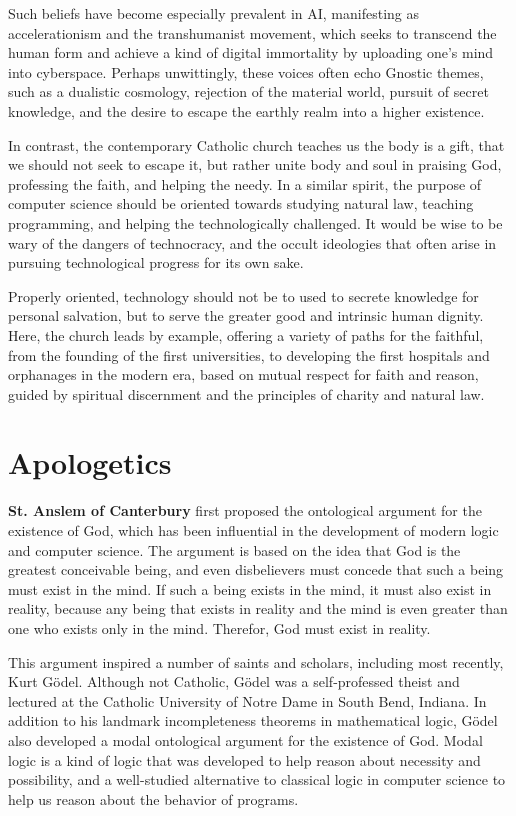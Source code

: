 \documentclass[sigplan,nonacm]{acmart}\settopmatter{printfolios=false,printccs=false,printacmref=false}
\begin{document}
  Such beliefs have become especially prevalent in AI, manifesting as accelerationism and the transhumanist movement, which seeks to transcend the human form and achieve a kind of digital immortality by uploading one's mind into cyberspace. Perhaps unwittingly, these voices often echo Gnostic themes, such as a dualistic cosmology, rejection of the material world, pursuit of secret knowledge, and the desire to escape the earthly realm into a higher existence.

  In contrast, the contemporary Catholic church teaches us the body is a gift, that we should not seek to escape it, but rather unite body and soul in praising God, professing the faith, and helping the needy. In a similar spirit, the purpose of computer science should be oriented towards studying natural law, teaching programming, and helping the technologically challenged. It would be wise to be wary of the dangers of technocracy, and the occult ideologies that often arise in pursuing technological progress for its own sake.

  Properly oriented, technology should not be to used to secrete knowledge for personal salvation, but to serve the greater good and intrinsic human dignity. Here, the church leads by example, offering a variety of paths for the faithful, from the founding of the first universities, to developing the first hospitals and orphanages in the modern era, based on mutual respect for faith and reason, guided by spiritual discernment and the principles of charity and natural law.

  \section{Apologetics}

  \textbf{St. Anslem of Canterbury} first proposed the ontological argument for the existence of God, which has been influential in the development of modern logic and computer science. The argument is based on the idea that God is the greatest conceivable being, and even disbelievers must concede that such a being must exist in the mind. If such a being exists in the mind, it must also exist in reality, because any being that exists in reality and the mind is even greater than one who exists only in the mind. Therefor, God must exist in reality.

  This argument inspired a number of saints and scholars, including most recently, Kurt G\"odel. Although not Catholic, G\"odel was a self-professed theist and lectured at the Catholic University of Notre Dame in South Bend, Indiana. In addition to his landmark incompleteness theorems in mathematical logic, G\"odel also developed a modal ontological argument for the existence of God. Modal logic is a kind of logic that was developed to help reason about necessity and possibility, and a well-studied alternative to classical logic in computer science to help us reason about the behavior of programs.
\end{document}

